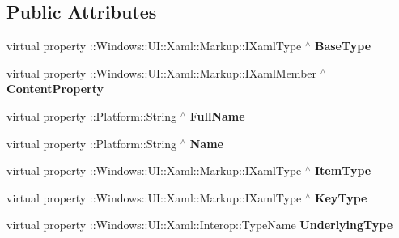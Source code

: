 \subsection*{Public Attributes}
\begin{DoxyCompactItemize}
\item 
virtual property \+::Windows\+::\+U\+I\+::\+Xaml\+::\+Markup\+::\+I\+Xaml\+Type $^\wedge$ {\bfseries Base\+Type}
\item 
virtual property \+::Windows\+::\+U\+I\+::\+Xaml\+::\+Markup\+::\+I\+Xaml\+Member $^\wedge$ {\bfseries Content\+Property}
\item 
virtual property \+::Platform\+::\+String $^\wedge$ {\bfseries Full\+Name}
\item 
virtual property \+::Platform\+::\+String $^\wedge$ {\bfseries Name}
\item 
virtual property \+::Windows\+::\+U\+I\+::\+Xaml\+::\+Markup\+::\+I\+Xaml\+Type $^\wedge$ {\bfseries Item\+Type}
\item 
virtual property \+::Windows\+::\+U\+I\+::\+Xaml\+::\+Markup\+::\+I\+Xaml\+Type $^\wedge$ {\bfseries Key\+Type}
\item 
virtual property \+::Windows\+::\+U\+I\+::\+Xaml\+::\+Interop\+::\+Type\+Name {\bfseries Underlying\+Type}
\end{DoxyCompactItemize}
